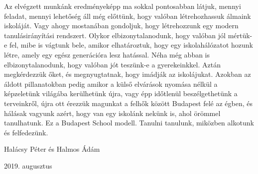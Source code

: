 Az elvégzett munkánk eredményeképp ma sokkal pontosabban látjuk, mennyi feladat, mennyi lehetőség áll még előttünk, hogy valóban létrehozhassuk álmaink iskoláját. Vagy ahogy mostanában gondoljuk, hogy létrehozzunk egy modern tanulásirányítási rendszert. Olykor elbizonytalanodunk, hogy valóban jól mértük-e fel, mibe is vágtunk bele, amikor elhatároztuk, hogy egy iskolahálózatot hozunk létre, amely egy egész generációra lesz hatással. Néha még abban is elbizonytalanodunk, hogy valóban jót teszünk-e a gyerekeinkkel. Aztán megkérdezzük őket, és megnyugtatnak, hogy imádják az iskolájukat. Azokban az áldott pillanatokban pedig amikor a külső elvárások nyomása nélkül a képzeletünk világába kerülhetünk újra, vagy épp időtlenül beszélgethetünk a terveinkről, újra ott érezzük magunkat a felhők között Budapest felé az égben, és hálásak vagyunk azért, hogy van egy iskolánk nekünk is, ahol örömmel tanulhatunk. Ez a Budapest School modell. Tanulni tanulunk, miközben alkotunk és felfedezünk. 



\bigskip
{
\raggedright Halácsy Péter és Halmos Ádám\\
\raggedright 2019. augusztus
}